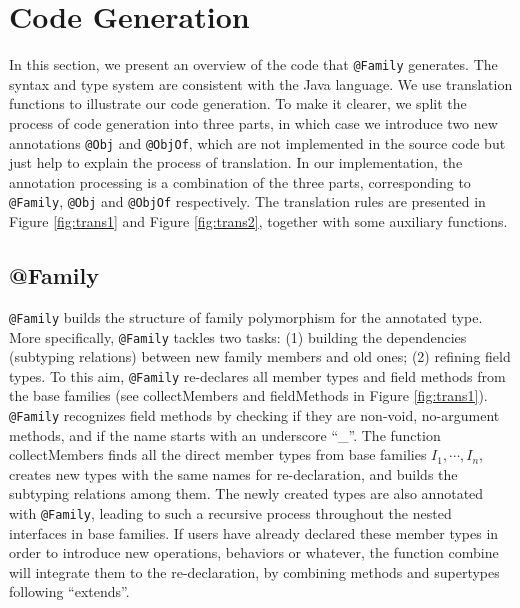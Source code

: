 \section{Code Generation}


In this section, we present an overview of the code that \lstinline{@Family} generates. The syntax and type system are
consistent with the Java language. We use translation functions to illustrate our code generation.
To make it clearer, we split the process of code generation into three parts, in which case we introduce two
new annotations \lstinline{@Obj} and \lstinline{@ObjOf}, which are not implemented in the source code but just help to explain
the process of translation. In our implementation, the annotation processing is a combination of the three parts, corresponding to
\lstinline{@Family}, \lstinline{@Obj} and \lstinline{@ObjOf} respectively. The translation rules are presented in Figure \ref{fig:trans1}
and Figure \ref{fig:trans2}, together with some auxiliary functions.

\subsection{\textsf{@Family}}
\lstinline{@Family} builds the structure of family polymorphism for the annotated type. More specifically, \lstinline{@Family} tackles two
tasks: (1) building the dependencies (subtyping relations) between new family members and old ones; (2) refining field types. To this
aim, \lstinline{@Family} re-declares all member types and field methods from the base families (see \textsf{collectMembers} and \textsf{fieldMethods} in Figure \ref{fig:trans1}). \lstinline{@Family} recognizes field methods by checking if they are non-void, no-argument methods, and if the name starts with an underscore ``\_''.  The function \textsf{collectMembers} finds all the direct member types from base families $I_1,\cdots,I_n$, creates new types with the same names for re-declaration, and builds the subtyping relations among them. The newly created types are also annotated with \lstinline{@Family}, leading to such a recursive process throughout the nested interfaces in base families. If users have already declared these member types in order to introduce new operations, behaviors or whatever, the function \textsf{combine} will integrate them to the re-declaration, by combining methods and supertypes following ``extends''.

